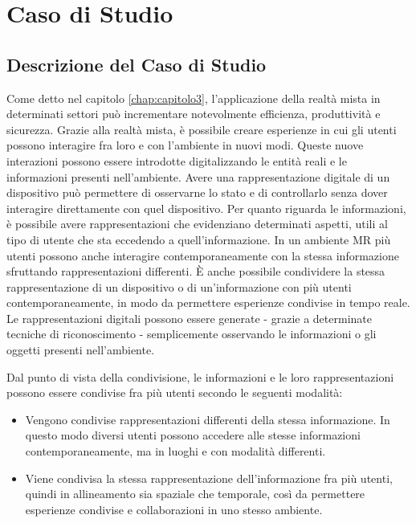 \chapter{Caso di Studio}

\section{Descrizione del Caso di Studio}

Come detto nel capitolo \ref{chap:capitolo3}, l'applicazione della realtà mista in determinati settori può incrementare notevolmente efficienza, produttività e sicurezza.
Grazie alla realtà mista, è possibile creare esperienze in cui gli utenti possono interagire fra loro e con l'ambiente in nuovi modi.
Queste nuove interazioni possono essere introdotte digitalizzando le entità reali e le informazioni presenti nell'ambiente.
Avere una rappresentazione digitale di un dispositivo può permettere di osservarne lo stato e di controllarlo senza dover interagire direttamente con quel dispositivo. Per quanto riguarda le informazioni, è possibile avere rappresentazioni che evidenziano determinati aspetti, utili al tipo di utente che sta eccedendo a quell'informazione.
In un ambiente MR più utenti possono anche interagire contemporaneamente con la stessa informazione sfruttando rappresentazioni differenti.
È anche possibile condividere la stessa rappresentazione di un dispositivo o di un'informazione con più utenti contemporaneamente, in modo da permettere esperienze condivise in tempo reale.
Le rappresentazioni digitali possono essere generate - grazie a determinate tecniche di riconoscimento - semplicemente osservando le informazioni o gli oggetti presenti nell'ambiente.

Dal punto di vista della condivisione, le informazioni e le loro rappresentazioni possono essere condivise fra più utenti secondo le seguenti modalità:
\begin{itemize}
    \item Vengono condivise rappresentazioni differenti della stessa informazione. In questo modo diversi utenti possono accedere alle stesse informazioni contemporaneamente, ma in luoghi e con modalità differenti.
    \item Viene condivisa la stessa rappresentazione dell'informazione fra più utenti, quindi in allineamento sia spaziale che temporale, così da permettere esperienze condivise e collaborazioni in uno stesso ambiente.
\end{itemize}

